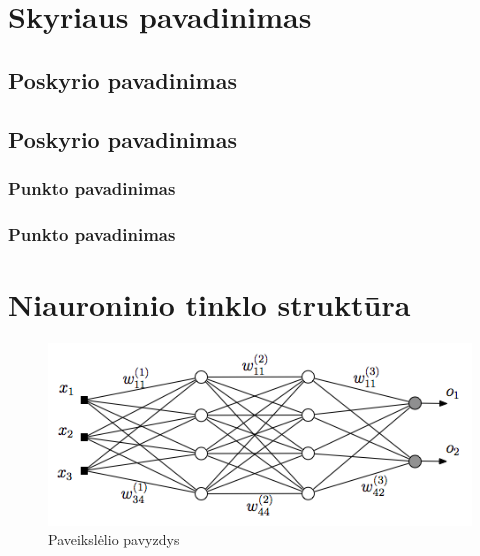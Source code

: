 \documentclass[12pt, a4paper, lithuanian]{article}
\begin{document}
\section{Skyriaus pavadinimas}
\subsection{Poskyrio pavadinimas}
\subsection{Poskyrio pavadinimas}
\subsubsection{Punkto pavadinimas}
\subsubsection{Punkto pavadinimas}







\appendix

\section{Niauroninio tinklo struktūra}
\begin{figure}[H]
    \centering
    \includegraphics[scale=0.5]{img/MLP}
    \caption{Paveikslėlio pavyzdys}
    \label{img:mlp}
\end{figure}
\end{document}
